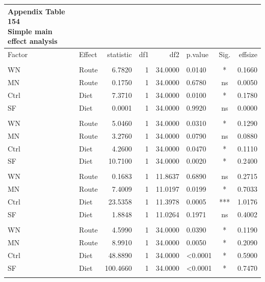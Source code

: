 \documentclass[
  12pt,
  letterpaper,
]{article}
\begin{document}
\begingroup
\fontsize{12.0pt}{14.4pt}\selectfont
\begin{longtable}{l|lrrrlcr}
\caption*{
{\large \textbf{Appendix Table 154}} \\ 
{\small \textbf{Simple main effect analysis}}
} \\ 
\toprule
Factor & {Effect} & {statistic} & {df1} & {df2} & {p.value} & {Sig.} & {effsize} \\ 
\midrule\addlinespace[2.5pt]
\multicolumn{8}{l}{IFN-gamma} \\[2.5pt] 
\midrule\addlinespace[2.5pt]
WN & Route & 6.7820 & 1 & 34.0000 & 0.0140 & * & 0.1660 \\ 
MN & Route & 0.1750 & 1 & 34.0000 & 0.6780 & ns & 0.0050 \\ 
Ctrl & Diet & 7.3710 & 1 & 34.0000 & 0.0100 & * & 0.1780 \\ 
SF & Diet & 0.0001 & 1 & 34.0000 & 0.9920 & ns & 0.0000 \\ 
\midrule\addlinespace[2.5pt]
\multicolumn{8}{l}{IL-10} \\[2.5pt] 
\midrule\addlinespace[2.5pt]
WN & Route & 5.0460 & 1 & 34.0000 & 0.0310 & * & 0.1290 \\ 
MN & Route & 3.2760 & 1 & 34.0000 & 0.0790 & ns & 0.0880 \\ 
Ctrl & Diet & 4.2600 & 1 & 34.0000 & 0.0470 & * & 0.1110 \\ 
SF & Diet & 10.7100 & 1 & 34.0000 & 0.0020 & * & 0.2400 \\ 
\midrule\addlinespace[2.5pt]
\multicolumn{8}{l}{IL-12p70} \\[2.5pt] 
\midrule\addlinespace[2.5pt]
WN & Route & 0.1683 & 1 & 11.8637 & 0.6890 & ns & 0.2715 \\ 
MN & Route & 7.4009 & 1 & 11.0197 & 0.0199 & * & 0.7033 \\ 
Ctrl & Diet & 23.5358 & 1 & 11.3978 & 0.0005 & *** & 1.0176 \\ 
SF & Diet & 1.8848 & 1 & 11.0264 & 0.1971 & ns & 0.4002 \\ 
\midrule\addlinespace[2.5pt]
\multicolumn{8}{l}{IL-17A} \\[2.5pt] 
\midrule\addlinespace[2.5pt]
WN & Route & 4.5990 & 1 & 34.0000 & 0.0390 & * & 0.1190 \\ 
MN & Route & 8.9910 & 1 & 34.0000 & 0.0050 & * & 0.2090 \\ 
Ctrl & Diet & 48.8890 & 1 & 34.0000 & <0.0001 & * & 0.5900 \\ 
SF & Diet & 100.4660 & 1 & 34.0000 & <0.0001 & * & 0.7470 \\ 
\midrule\addlinespace[2.5pt]

\end{longtable}
\end{document}
